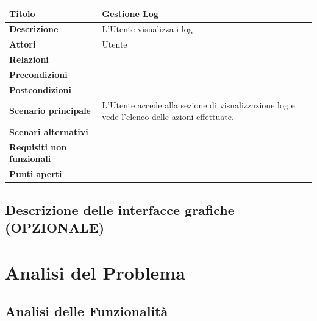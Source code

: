 \documentclass[a4paper, 11pt]{article}
\begin{document}
\begin{center}
    \begin{tabular}{ |p{5cm}|p{9.5cm}|  }
        \hline
        \textbf{Titolo} & Gestione Log \\
        \hline
        \textbf{Descrizione} & L'Utente visualizza i log \\
        \hline
        \textbf{Attori} & Utente \\
        \hline
        \textbf{Relazioni} & \\
        \hline
        \textbf{Precondizioni} &  \\
        \hline
        \textbf{Postcondizioni} & \\
        \hline
        \textbf{Scenario principale} & L'Utente accede alla sezione di visualizzazione log e vede l'elenco delle azioni effettuate.
        \\
        \hline
        \textbf{Scenari alternativi} & \\
        \hline
        \textbf{Requisiti non funzionali} & \\
        \hline
        \textbf{Punti aperti} &  \\
        \hline
    \end{tabular}
\end{center}


\newpage

\subsection{Descrizione delle interfacce grafiche (OPZIONALE)}

\newpage
\section{Analisi del Problema}
\subsection{Analisi delle Funzionalità}
\end{document}
